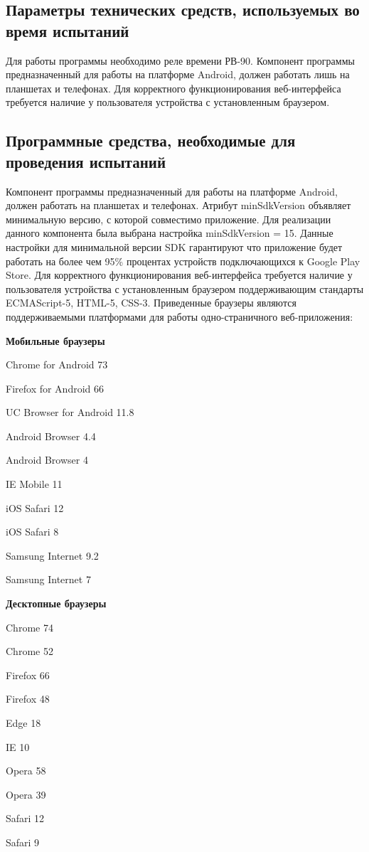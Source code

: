 \subsection{Параметры технических средств, используемых во время испытаний}
Для работы программы необходимо реле времени РВ-90. Компонент программы предназначенный для работы на платформе Android, должен работать лишь на планшетах и телефонах.
Для корректного функционирования веб-интерфейса требуется наличие у пользователя устройства с установленным браузером.


\subsection{Программные средства, необходимые для проведения испытаний}
Компонент программы предназначенный для работы на платформе Android, должен работать на планшетах и телефонах. 
Атрибут minSdkVersion объявляет минимальную версию, с которой совместимо приложение. Для реализации данного компонента была выбрана настройка minSdkVersion = 15. Данные настройки для минимальной версии SDK гарантируют что приложение будет работать на более чем 95\% процентах устройств подключающихся к Google Play Store.
Для корректного функционирования веб-интерфейса требуется наличие у пользователя устройства с установленным браузером поддерживающим стандарты ECMAScript-5, HTML-5, CSS-3. Приведенные браузеры являются поддерживаемыми платформами для работы одно-страничного веб-приложения:

\textbf{Мобильные браузеры}
\begin{my_enumerate}
\item Chrome for Android 73
\item Firefox for Android 66
\item UC Browser for Android 11.8
\item Android Browser 4.4
\item Android Browser 4
\item IE Mobile 11
\item iOS Safari 12
\item iOS Safari 8
\item Samsung Internet 9.2
\item Samsung Internet 7
\end{my_enumerate}

\textbf{Десктопные браузеры}
\begin{my_enumerate}
\item Chrome 74
\item Chrome 52
\item Firefox 66
\item Firefox 48
\item Edge 18
\item IE 10
\item Opera 58
\item Opera 39
\item Safari 12
\item Safari 9
\end{my_enumerate}


